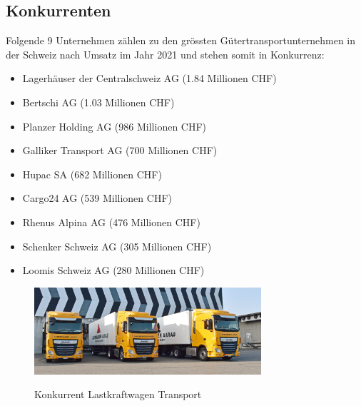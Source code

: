 \documentclass{article}
\begin{document}
\cleardoublepage
\subsection{Konkurrenten}
Folgende 9 Unternehmen zählen zu den grössten Gütertransportunternehmen in der Schweiz nach Umsatz im Jahr 2021 und stehen somit in Konkurrenz:
\begin{itemize}
\item Lagerhäuser der Centralschweiz AG (1.84 Millionen CHF)
\item Bertschi AG (1.03 Millionen CHF)
\item Planzer Holding AG (986 Millionen CHF)
\item Galliker Transport AG (700 Millionen CHF)
\item Hupac SA (682 Millionen CHF)
\item Cargo24 AG (539 Millionen CHF)
\item Rhenus Alpina AG (476 Millionen CHF)
\item Schenker Schweiz AG (305 Millionen CHF)
\item Loomis Schweiz AG (280 Millionen CHF)
\end{itemize}
\parencite[o. S.]{groessteUnternehmenGuetertransport}

\begin{figure}[htbp] %
    \centering
    \includegraphics[width=0.75\textwidth]{konkurenz} %
    \caption{Konkurrent Lastkraftwagen Transport}\parencite[o. S.]{konkurenzBild}
    \label{fig:bildlabel5}
\end{figure}
\end{document}
